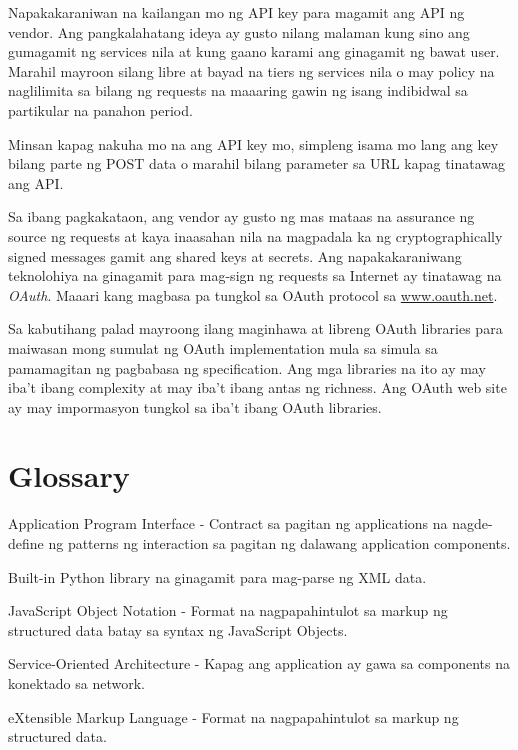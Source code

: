 \documentclass[10pt,]{book}
\providecommand{\tightlist}{%
  \setlength{\itemsep}{0pt}\setlength{\parskip}{0pt}}
\begin{document}
Napakakaraniwan na kailangan mo ng API key para magamit ang API ng
vendor. Ang pangkalahatang ideya ay gusto nilang malaman kung sino ang
gumagamit ng services nila at kung gaano karami ang ginagamit ng bawat
user. Marahil mayroon silang libre at bayad na tiers ng services nila o
may policy na naglilimita sa bilang ng requests na maaaring gawin ng
isang indibidwal sa partikular na panahon period.

Minsan kapag nakuha mo na ang API key mo, simpleng isama mo lang ang key
bilang parte ng POST data o marahil bilang parameter sa URL kapag
tinatawag ang API.

Sa ibang pagkakataon, ang vendor ay gusto ng mas mataas na assurance ng
source ng requests at kaya inaasahan nila na magpadala ka ng
cryptographically signed messages gamit ang shared keys at secrets. Ang
napakakaraniwang teknolohiya na ginagamit para mag-sign ng requests sa
Internet ay tinatawag na \emph{OAuth}. Maaari kang magbasa pa tungkol sa
OAuth protocol sa \href{http://www.oauth.net}{www.oauth.net}.

Sa kabutihang palad mayroong ilang maginhawa at libreng OAuth libraries
para maiwasan mong sumulat ng OAuth implementation mula sa simula sa
pamamagitan ng pagbabasa ng specification. Ang mga libraries na ito ay
may iba't ibang complexity at may iba't ibang antas ng richness. Ang
OAuth web site ay may impormasyon tungkol sa iba't ibang OAuth
libraries.

\section{Glossary}\label{glossary-12}

\begin{description}
\tightlist
\item[API]
Application Program Interface - Contract sa pagitan ng applications na
nagde-define ng patterns ng interaction sa pagitan ng dalawang
application components. 
\item[ElementTree]
Built-in Python library na ginagamit para mag-parse ng XML data.
\item[JSON]
JavaScript Object Notation - Format na nagpapahintulot sa markup ng
structured data batay sa syntax ng JavaScript Objects. 
\item[SOA]
Service-Oriented Architecture - Kapag ang application ay gawa sa
components na konektado sa network. 
\item[XML]
eXtensible Markup Language - Format na nagpapahintulot sa markup ng
structured data.  
\end{description}
\end{document}
